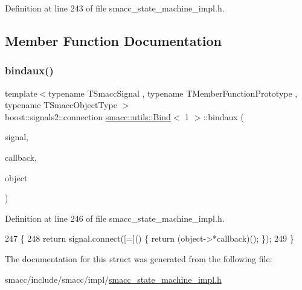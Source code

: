 Definition at line 243 of file smacc\+\_\+state\+\_\+machine\+\_\+impl.\+h.



\subsection{Member Function Documentation}
\mbox{\label{structsmacc_1_1utils_1_1Bind_3_011_01_4_a5704d3cff0b914fc899ff385ff8f8bc2}} 
\subsubsection{\texorpdfstring{bindaux()}{bindaux()}}
{\footnotesize\ttfamily template$<$typename T\+Smacc\+Signal , typename T\+Member\+Function\+Prototype , typename T\+Smacc\+Object\+Type $>$ \\
boost\+::signals2\+::connection \hyperlink{structsmacc_1_1utils_1_1Bind}{smacc\+::utils\+::\+Bind}$<$ 1 $>$\+::bindaux (\begin{DoxyParamCaption}\item[{T\+Smacc\+Signal \&}]{signal,  }\item[{T\+Member\+Function\+Prototype}]{callback,  }\item[{T\+Smacc\+Object\+Type $\ast$}]{object }\end{DoxyParamCaption})\hspace{0.3cm}{\ttfamily [inline]}}



Definition at line 246 of file smacc\+\_\+state\+\_\+machine\+\_\+impl.\+h.


\begin{DoxyCode}
247     \{
248         \textcolor{keywordflow}{return} signal.connect([=]() \{ \textcolor{keywordflow}{return} (object->*callback)(); \});
249     \}
\end{DoxyCode}


The documentation for this struct was generated from the following file\+:\begin{DoxyCompactItemize}
\item 
smacc/include/smacc/impl/\hyperlink{smacc__state__machine__impl_8h}{smacc\+\_\+state\+\_\+machine\+\_\+impl.\+h}\end{DoxyCompactItemize}
